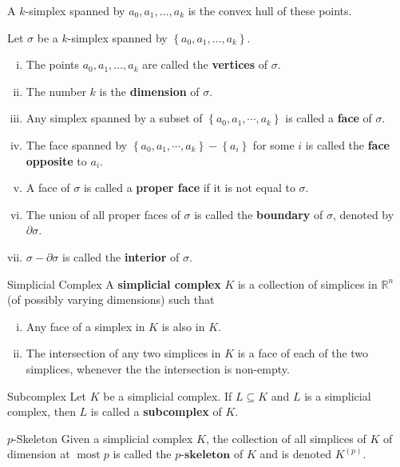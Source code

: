 \documentclass{report}
\begin{document}
\noindent A $k$-simplex spanned by $a_0, a_1, \ldots, a_k$ is the convex hull of these points.
\begin{definition}{}{}
	Let $\sigma$ be a $k$-simplex spanned by $\left\{a_0, a_1, \ldots, a_k\right\}$.
	\begin{enumerate}[(i)]
		\item The points $a_0, a_1, \ldots, a_k$ are called the \textbf{vertices} of $\sigma$.
		\item The number $k$ is the \textbf{dimension} of $\sigma$.
		\item Any simplex spanned by a subset of $\left\{a_0, a_1, \cdots, a_k\right\}$ is called a \textbf{face} of $\sigma$.
		\item The face spanned by $\left\{a_0, a_1, \cdots, a_k\right\}-\left\{a_i\right\}$ for some $i$ is called the \textbf{face opposite} to $a_i$.
		\item A face of $\sigma$ is called a \textbf{proper face} if it is not equal to $\sigma$.
		\item The union of all proper faces of $\sigma$ is called the \textbf{boundary} of $\sigma$, denoted by $\partial \sigma$.
		\item $\sigma-\partial \sigma$ is called the \textbf{interior} of $\sigma$.
	\end{enumerate}
\end{definition}

\begin{definition}{Simplicial Complex}{}
	A \textbf{simplicial complex} $K$ is a collection of simplices in $\mathbb{R}^n$ (of possibly varying dimensions) such that
	\begin{enumerate}[(i)]
		\item Any face of a simplex in $K$ is also in $K$.
		\item The intersection of any two simplices in $K$ is a face of each of the two simplices, whenever the the intersection is non-empty.
	\end{enumerate}
\end{definition}


\begin{definition}{Subcomplex}{}
	Let $K$ be a simplicial complex. If $L\subseteq K$ and $L$ is a simplicial complex, then $L$ is called a \textbf{subcomplex} of $K$.
\end{definition}


\begin{definition}{$p$-Skeleton}{}
	Given a simplicial complex $K$, the collection of all simplices of $K$ of dimension at $\operatorname{most} p$ is called the $\textbf{$p$-skeleton}$ of $K$ and is denoted $K^{(p)}$.
\end{definition}
\end{document}
